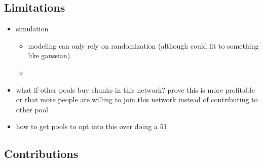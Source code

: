 \subsection{Limitations}

\begin{itemize}
  \item simulation
  \begin{itemize}
    \item modeling can only rely on randomization (although could fit to something like gaussian)
    \item 
  \end{itemize}
  \item what if other pools buy chunks in this network? prove this is more profitable or that more people are willing to join this network instead of contributing to other pool
  \item how to get pools to opt into this over doing a 51%
\end{itemize}

\subsection{Contributions}